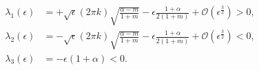 \documentclass[a4paper,11pt]{article}
\newtheorem{proposition}{Proposition}[section]
\theoremstyle{remark}
\begin{document}
\begin{align*}
 \lambda_1(\epsilon) &= +\sqrt{\epsilon} (2\pi k)\sqrt{\frac{\alpha-m}{1+m}} - \epsilon\frac{1+\alpha}{2(1+m)} + \mathcal{O}(\epsilon^{\frac{3}{2}}) > 0,\\
 \lambda_2(\epsilon) &= -\sqrt{\epsilon} (2\pi k)\sqrt{\frac{\alpha-m}{1+m}} - \epsilon\frac{1+\alpha}{2(1+m)} + \mathcal{O}(\epsilon^{\frac{3}{2}}) < 0,\\
 \lambda_3(\epsilon) &= -\epsilon(1+\alpha)<0. 
\end{align*}
% 
% 
\end{document}
